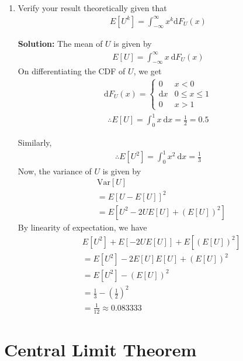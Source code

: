 \documentclass[journal,12pt,twocolumn]{IEEEtran}
\newcommand{\solution}{\noindent \textbf{Solution: }}
\providecommand{\brak}[1]{\ensuremath{\left(#1\right)}}
\providecommand{\mean}[1]{E\left[ #1 \right]}
\providecommand{\var}[1]{\mathrm{Var}\left[ #1 \right]}
\numberwithin{equation}{section}
\renewcommand\thesection{\arabic{section}}
\begin{document}
\begin{enumerate}[label=\thesection.\arabic*,ref=\thesection.\theenumi]
	\item Verify your result theoretically given that
	\begin{align}
		\mean{U^k} = \int_{-\infty}^{\infty}x^k \mathrm{d}F_{U}(x)
	\end{align}
		
	\solution The mean of $U$ is given by
	\begin{align}
		\mean{U} = \int_{-\infty}^{\infty}x ~\mathrm{d}F_{U}(x) 
	\end{align}
	On differentiating the CDF of $U$, we get
	\begin{align}
		\mathrm{d}F_{U}(x) = 
		\begin{cases}
			0 & x < 0 \\
			\mathrm{d}x & 0 \le x \le 1 \\
			0 & x > 1
		\end{cases}
	\end{align}
	\begin{align}
		\therefore \mean{U} = \int_{0}^{1}x ~\mathrm{d}x = \frac12 = 0.5
	\end{align}
	
	Similarly,
	\begin{align}
		\therefore \mean{U^2} = \int_{0}^{1}x^2 ~\mathrm{d}x = \frac13
	\end{align}
	Now, the variance of $U$ is given by
	\begin{align}
		&\var{U} \\
		&= \mean{U- \mean{U}}^2 \\
		&= \mean{U^2 - 2U\mean{U} + (\mean{U})^2}
	\end{align}
	By linearity of expectation, we have
	\begin{align}
		&\mean{U^2} + \mean{-2U\mean{U}} + \mean{(\mean{U})^2} \\
		&= \mean{U^2} -2\mean{U}\mean{U} + (\mean{U})^2 \\
		&= \mean{U^2} - (\mean{U})^2 \\
		&= \frac13 - \brak{\frac12}^2 \\
		&= \frac{1}{12} \approx 0.083333
	\end{align}
	
	\end{enumerate}
	
	\section{Central Limit Theorem}
\end{document}

